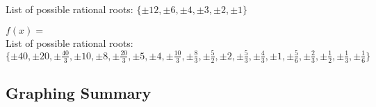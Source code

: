\documentclass[12pt]{book}
\theoremstyle{definition}
\newcommand{\Desmos}{\href{https://www.desmos.com/}{Desmos}}
\begin{document}
\begin{oddenumerate}
	List of possible rational roots: $\{\pm 12, \pm 6, \pm 4, \pm 3, \pm 2, \pm 1 \}$
	\item $f(x) = $ \\
	List of possible rational roots:\\
	$\{\pm 40, \pm 20, \pm{\frac{40}{3}}, \pm 10, \pm 8, \pm{\frac{20}{3}}, \pm 5, \pm 4, \pm{\frac{10}{3}}, \pm{\frac{8}{3}}, \pm{\frac{5}{2}}, \pm 2, \pm{\frac{5}{3}}, \pm{\frac{4}{3}}, \pm 1, \pm{\frac{5}{6}}, \pm{\frac{2}{3}}, \pm{\frac{1}{2}}, \pm{\frac{1}{3}}, \pm{\frac{1}{6}} \}$
\end{oddenumerate}
\subsection*{Graphing Summary}
\end{document}
